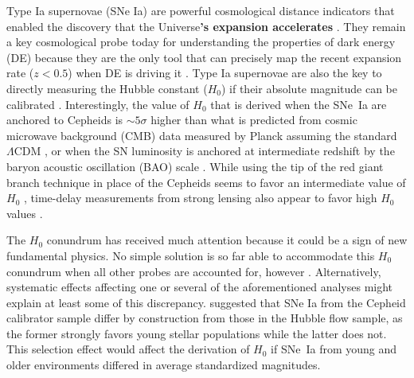\documentclass[]{aa}
\begin{document}
Type Ia supernovae (SNe Ia) are powerful cosmological distance indicators that
enabled the discovery that the Universe\textbf{'s expansion accelerates}
\citep{riess1998, perlmutter1999}. They remain a key cosmological probe today
for understanding the properties of dark energy (DE) because they are the only
tool that can precisely map the recent expansion rate ($z<0.5$) when DE is
driving it \citep[e.g.,][]{scolnicastro2020}. Type Ia supernovae are also the
key to directly measuring the Hubble constant ($H_0$) if their absolute
magnitude can be calibrated \citep{riess2016, freedman2019}. Interestingly, the
value of $H_0$ that is derived when the SNe~Ia are anchored to Cepheids
\citep[the Supernovae, $H_0$, for the Equation of State of dark energy
project,][]{riess2009, riess2016} is $\sim5\sigma$ higher than what is predicted
from cosmic microwave background (CMB) data measured by Planck assuming the
standard $\Lambda$CDM \citep{planck2018, riess2019, reid2019}, or when the SN
luminosity is anchored at intermediate redshift by the baryon acoustic
oscillation (BAO) scale \citep{feeney2019}. While using the tip of the red giant
branch technique in place of the Cepheids seems to favor an intermediate value
of $H_0$ \citep{freedman2019, freedman2020}, time-delay measurements from strong
lensing also appear to favor high $H_0$ values \citep{wong2019}.

The $H_0$ conundrum has received much attention because it could be a sign of
new fundamental physics. No simple solution is so far able to accommodate this
$H_0$ conundrum when all other probes are accounted for, however
\citep{knox2019}. Alternatively, systematic effects affecting one or several of
the aforementioned analyses might explain at least some of this discrepancy.
\cite{rigault2015} suggested that SNe Ia from the Cepheid calibrator sample
differ by construction from those in the Hubble flow sample, as the former
strongly favors young stellar populations while the latter does not. This
selection effect would affect the derivation of $H_0$ if SNe~Ia from young and
older environments differed in average standardized magnitudes. 
\end{document}
